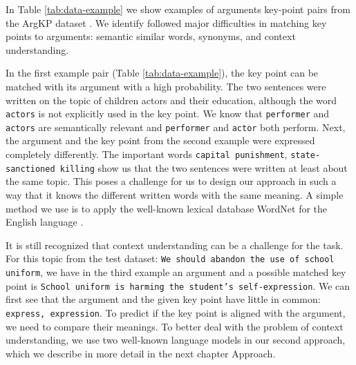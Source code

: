 In Table \ref{tab:data-example} we show examples of arguments key-point pairs from the ArgKP dataset \cite{Bar-HaimEFKLS2020}. 
We identify followed major difficulties in matching key points to arguments: semantic similar words, synonyms, and context understanding.

In the first example pair (Table \ref{tab:data-example}), the key point can be matched with its argument with a high probability. 
The two sentences were written on the topic of children actors and their education, although the word \texttt{actors} is not explicitly used in the key point. 
We know that \texttt{performer} and \texttt{actors} are semantically relevant and \texttt{performer} and \texttt{actor} both perform. Next, the argument and the key point from the second example were expressed completely differently. 
The important words \texttt{capital punishment}, \texttt{state-sanctioned killing} show us that the two sentences were written at least about the same topic. 
This poses a challenge for us to design our approach in such a way that it knows the different written words with the same meaning. 
A simple method we use is to apply the well-known lexical database WordNet for the English language \cite{Miller1995}.

It is still recognized that context understanding can be a challenge for the task. For this topic from the test dataset:
\texttt{We should abandon the use of school uniform}, we have in the third example an argument and a possible matched key point is \texttt{School uniform is harming the student's self-expression}. 
We can first see that the argument and the given key point have little in common: \texttt{express, expression}. 
To predict if the key point is aligned with the argument, we need to compare their meanings. 
To better deal with the problem of context understanding, we use two well-known language models in our second approach, which we describe in more detail in the next chapter Approach.
